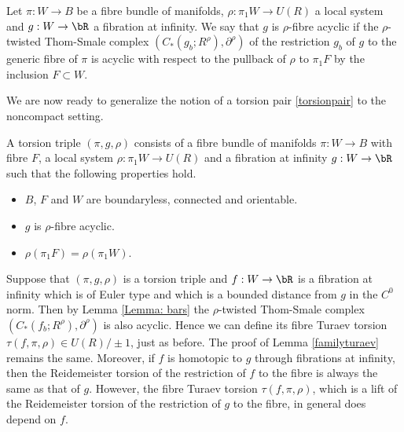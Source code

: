 \begin{definition}
Let $\pi: W \to B$ be a fibre bundle of manifolds, $\rho: \pi_1W \to U(R)$ a local system and $g:W \to \bR$ a fibration at infinity. We say that $g$ is $\rho$-fibre acyclic if the $\rho$-twisted Thom-Smale complex $(C_*(g_b; R^\rho), \partial^\rho)$ of the restriction $g_b$ of $g$ to the generic fibre of $\pi$ is acyclic with respect to the pullback of $\rho$ to $\pi_1F$ by the inclusion $F \subset W$.
\end{definition}

We are now ready to generalize the notion of a torsion pair \ref{torsionpair} to the noncompact setting.

\begin{definition}\label{torsiontriple}
A torsion triple $(\pi, g, \rho)$ consists of a fibre bundle of manifolds $\pi: W \to B$ with fibre $F$, a local system $\rho: \pi_1W \to U(R)$ and a fibration at infinity $g:W \to \bR$ such that the following properties hold.
\begin{itemize}
\item $B$, $F$ and $W$ are boundaryless, connected and orientable.
\item $g$ is $\rho$-fibre acyclic.
\item $\rho(\pi_1F)=\rho(\pi_1W)$.
\end{itemize}
\end{definition}
Suppose that $(\pi, g, \rho)$ is a torsion triple and $f:W \to \bR$ is a fibration at infinity which is of Euler type and which is a bounded distance from $g$ in the $C^0$ norm. Then by Lemma \ref{Lemma: bars} the $\rho$-twisted Thom-Smale complex $(C_*(f_b; R^\rho), \partial^\rho)$ is also acyclic. Hence we can define its fibre Turaev torsion $\tau( f,\pi,\rho) \in U(R) / \pm1 $, just as before. The proof of Lemma \ref{familyturaev} remains the same. Moreover, if $f$ is homotopic to $g$ through fibrations at infinity, then the Reidemeister torsion of the restriction of $f$ to the fibre is always the same as that of $g$. However, the fibre Turaev torsion $\tau(f,\pi, \rho)$, which is a lift of the Reidemeister torsion of the restriction of $g$ to the fibre, in general does depend on $f$.

